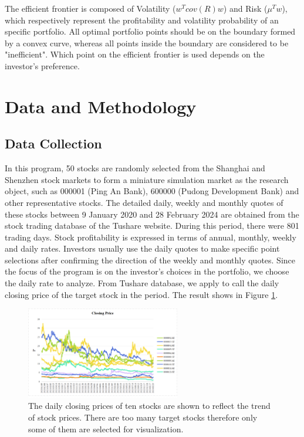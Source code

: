 \documentclass[default,iicol]{sn-jnl}%
\begin{document}
The efficient frontier is composed of Volatility ($w^{T} cov(R)w$) and Risk ($\mu^{T}w$), which respectively represent the profitability and volatility probability of an specific portfolio. All optimal portfolio points should be on the boundary formed by a convex curve, whereas all points inside the boundary are considered to be "inefficient". Which point on the efficient frontier is used depends on the investor's preference.

\section{Data and Methodology}\label{sec4}
\subsection{Data Collection}\label{sec4sub1}
\hspace{1.5em}In this program, 50 stocks are randomly selected from the Shanghai and Shenzhen stock markets to form a miniature simulation market as the research object, such as 000001 (Ping An Bank), 600000 (Pudong Development Bank) and other representative stocks. The detailed daily, weekly and monthly quotes of these stocks between 9 January 2020 and 28 February 2024 are obtained from the stock trading database of the Tushare website. During this period, there were 801 trading days. Stock profitability is expressed in terms of annual, monthly, weekly and daily rates. Investors usually use the daily quotes to make specific point selections after confirming the direction of the weekly and monthly quotes. Since the focus of the program is on the investor's choices in the portfolio, we choose the daily rate to analyze. From Tushare database, we apply to call the daily closing price of the target stock in the period. The result shows in Figure \ref{fg1}.

\begin{figure}[h]
	\centering    
	\includegraphics[width = 0.6\textwidth]{figures/Fig 1.png}
	\caption{The daily closing prices of ten stocks are shown to reflect the trend of stock prices. There are too many target stocks therefore only some of them are selected for visualization.}
	\label{fg1}
\end{figure}  
\end{document}
